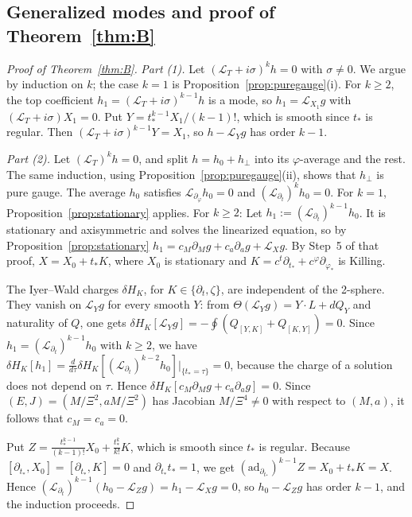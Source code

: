 \documentclass[11pt]{amsart}
\theoremstyle{definition}
\theoremstyle{remark}
\numberwithin{equation}{section}
\newcommand{\cL}{\mathcal{L}}
\begin{document}
\subsection{Generalized modes and proof of Theorem~\ref{thm:B}}
\begin{proof}[Proof of Theorem~\ref{thm:B}]
\emph{Part (1).} Let $(\cL_T+i\sigma)^kh=0$ with $\sigma\ne0$. We argue by induction on $k$; the case $k=1$ is
Proposition~\ref{prop:puregauge}(i). For $k\ge2$, the top coefficient $h_1=(\cL_T+i\sigma)^{k-1}h$ is a mode, so
$h_1=\cL_{X_1}g$ with $(\cL_T+i\sigma)X_1=0$. Put $Y=t_*^{k-1}X_1/(k-1)!$, which is smooth since $t_*$ is regular.
Then $(\cL_T+i\sigma)^{k-1}Y=X_1$, so $h-\cL_Yg$ has order $k-1$.

\emph{Part (2).} Let $(\cL_T)^kh=0$, and split $h=h_0+h_\perp$ into its $\varphi$-average and the rest. The same
induction, using Proposition~\ref{prop:puregauge}(ii), shows that $h_\perp$ is pure gauge. The average $h_0$
satisfies $\cL_{\partial_\varphi}h_0=0$ and $(\cL_{\partial_t})^kh_0=0$. For $k=1$, Proposition~\ref{prop:stationary}
applies. For $k\ge2$:
Let $h_1:=(\cL_{\partial_t})^{k-1}h_0$. It is stationary and axisymmetric and solves the linearized equation, so by
Proposition~\ref{prop:stationary} $h_1=c_M\partial_Mg+c_a\partial_ag+\cL_Xg$. By Step~5 of that proof, $X=X_0+t_*K$, where
$X_0$ is stationary and $K=c^t\partial_{t_*}+c^\varphi\partial_{\varphi_*}$ is Killing.

The Iyer--Wald charges $\delta H_K$, for $K\in\{\partial_t,\zeta\}$, are independent of the 2-sphere. They vanish
on $\cL_Yg$ for every smooth $Y$: from $\Theta(\cL_Yg)=Y\cdot L+dQ_Y$ and naturality of $Q$, one gets
$\delta H_K[\cL_Yg]=-\oint(Q_{[Y,K]}+Q_{[K,Y]})=0$. Since $h_1=(\cL_{\partial_t})^{k-1}h_0$ with $k\ge2$, we have
$\delta H_K[h_1]=\frac{d}{d\tau}\delta H_K[(\cL_{\partial_t})^{k-2}h_0]|_{\{t_*=\tau\}}=0$, because the charge of a
solution does not depend on $\tau$. Hence $\delta H_K[c_M\partial_Mg+c_a\partial_ag]=0$. Since
$(E,J)=(M/\Xi^2,aM/\Xi^2)$ has Jacobian $M/\Xi^4\ne0$ with respect to $(M,a)$, it follows that $c_M=c_a=0$.

Put $Z=\frac{t_*^{k-1}}{(k-1)!}X_0+\frac{t_*^{k}}{k!}K$, which is smooth since $t_*$ is regular. Because
$[\partial_{t_*},X_0]=[\partial_{t_*},K]=0$ and $\partial_{t_*}t_*=1$, we get $(\mathrm{ad}_{\partial_{t_*}})^{k-1}Z=X_0+t_*K=X$. Hence
$(\cL_{\partial_t})^{k-1}(h_0-\cL_Zg)=h_1-\cL_Xg=0$, so $h_0-\cL_Zg$ has order $k-1$, and the induction proceeds.
\end{proof}
\end{document}
